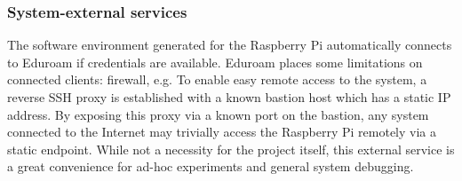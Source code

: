 \subsubsection{System-external services}
The software environment generated for the Raspberry Pi automatically connects to Eduroam if credentials are available.
Eduroam places some limitations on connected clients: firewall, e.g.
To enable easy remote access to the system, a reverse SSH proxy is established with a known bastion host which has a static IP address.
By exposing this proxy via a known port on the bastion, any system connected to the Internet may trivially access the Raspberry Pi remotely via a static endpoint.
While not a necessity for the project itself, this external service is a great convenience for ad-hoc experiments and general system debugging.

